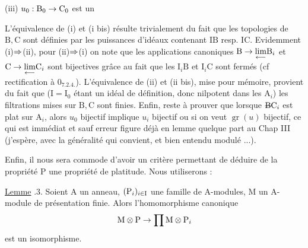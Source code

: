 (iii) $u_0:\mathrm B_0\to\mathrm C_0$ est un  \handwritten{$\uparrow$}

L’équivalence de (i) et (i bis) résulte trivialement du fait que les topologies de $\mathrm B,\mathrm C$ sont  définies par les puissances d’idéaux contenant $\mathrm{IB}$ resp. $\mathrm{IC}$.  Evidemment (i)$\Rightarrow$(ii), pour (ii)$\Rightarrow$(i) on note que les applications canoniques $\mathrm B\to\underset{\longleftarrow}{\lim}\mathrm B_i$ et $\mathrm C\to\underset{\longleftarrow}{\lim}\mathrm C_i$ sont bijectives grâce au fait que les $\mathrm I_i\mathrm B$ et $\mathrm I_i\mathrm C$ sont fermés (cf rectification à $0_{7.2.4.}$). L’équivalence de (ii) et (ii bis),  mise pour mémoire, provient du fait que ($\mathrm I=\mathrm I_0$ étant un idéal de définition, donc nilpotent dans les $\mathrm A_i$) les filtrations mises sur $\mathrm B,\mathrm C$ sont finies. Enfin, reste à prouver que lorsque  $\deleted{\mathrm B}\handwritten{\mathrm C}_i$ est plat sur $\mathrm A_i$, alors $u_0$ bijectif implique $u_i$ bijectif ou si on veut $\operatorname{gr}(u)$ bijectif, ce qui est immédiat et sauf erreur figure déjà en lemme quelque part au Chap III (j’espère, avec la généralité qui convient, et bien entendu modulé ...). 


Enfin, il nous sera commode d'avoir un critère permettant de déduire de la propriété $\mathrm P$ une propriété de platitude. Nous utiliserons :

\uline{Lemme} .3. Soient $\mathrm A$ un anneau, $(\mathrm P_i)_{i\in\mathrm I}$ une famille de $\mathrm A$-modules,  $\mathrm M$ un $\mathrm A$-module de présentation finie. Alors l'homomorphisme canonique
\[
\mathrm M\otimes\mathrm P\to\prod\mathrm M\otimes\mathrm P_i
\]
est un isomorphisme.

